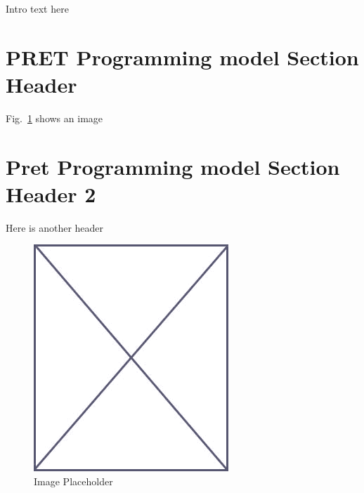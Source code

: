 Intro text here

\section{PRET Programming model Section Header}
\label{sec:pret_prog_model_sec_1}

Fig.~\ref{fig:placeholder_pret_wcet} shows an image

\section{Pret Programming model Section Header 2}
\label{sec:pret_prog_model_sec_2}

Here is another header


\begin{figure}
\begin{center}
\vspace{-32pt}
\includegraphics[scale=.45]{figs/placeholder}
\end{center}
\vspace{-12pt}
\caption{Image Placeholder}
\label{fig:placeholder_pret_wcet}
\end{figure}
